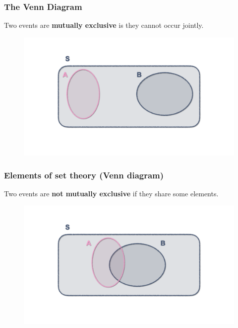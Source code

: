 \documentclass[notes=show]{beamer}\usepackage[]{graphicx}\usepackage[]{color}
\begin{document}
\begin{frame}
\frametitle{The Venn Diagram}


Two events are \textbf{mutually exclusive} is they cannot occur jointly.

\begin{figure}[h!]
\centering
\includegraphics[width=1\textwidth,height=0.7\textheight]{img/charts/charts.003.png}
\end{figure}
\end{frame}

\begin{frame}
\frametitle{Elements of set theory (Venn diagram)}

Two events are \textbf{not mutually exclusive} if they share some elements.


\begin{figure}[h!]
\centering
\includegraphics[width=1\textwidth,height=0.7\textheight]{img/charts/charts.004.png}
\end{figure}
\end{frame}
\end{document}
